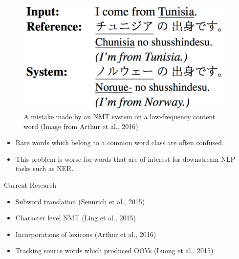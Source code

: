\documentclass[landscape]{jhuslides3C}
\begin{document}
\begin{figure}
\begin{center}
\includegraphics[scale=0.3]{images/rare.png}
\caption{A mistake made by an NMT system on a low-frequency content word ({\tiny Image from Arthur et al., 2016})}
\end{center}
\end{figure}
\begin{itemize}
\item Rare words which belong to a common word class are often confused.
\item This problem is worse for words that are of interest for downstream NLP tasks such as NER.
\end{itemize}

\vspace{10mm}
Current Research
\begin{itemize}
\item Subword translation (Sennrich et al., 2015)
\item Character level NMT (Ling et al., 2015)
\item Incorporations of lexicons (Arthur et al., 2016)
\item Tracking source words which produced OOVs (Luong et al., 2015)
\end{itemize}
\end{document}
